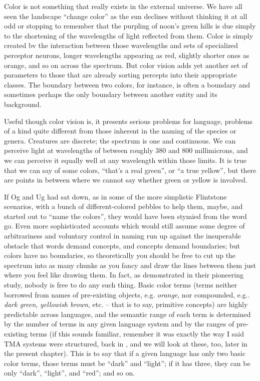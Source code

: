 Color is not something that really exists in the external universe. We have all seen the landscape ``change color'' as the sun declines without thinking it at all odd or stopping to remember that the purpling of noon's green hills is due simply to the shortening of the wavelengths of light reflected from them. Color is simply created bv the interaction between those wavelengths and sets of specialized perceptor neurons, longer wavelengths appearing as red, slightly shorter ones as orange, and so on across the spectrum. But color vision adds yet another set of parameters to those that are already sorting percepts into their
appropriate classes. The boundary between two colors, for instance, is often a boundary and sometimes perhaps the only boundary between another entity and its background.

Useful though color vision is, it presents serious problems for language, problems of a kind quite different from those inherent in the naming of the species or genera. Creatures are discrete; the spectrum is one and continuous. We can perceive light at wavelengths of between roughly 380 and 800 millimicrons, and we can perceive it equally well at any wavelength within those limits. It is true that we can say of some colors, ``that's a real green'', or ``a true yellow'', but there are points in between where we cannot say whether green or yellow is involved.

If Og and Ug had sat down, as in some of the more simplistic Flintstone scenarios, with a bunch of different-colored pebbles to help them, maybe, and started out to ``name the colors'', they would have been stymied from the word go. Even more sophisticated accounts which would still assume some degree of arbitrariness and voluntary control in naming run up against the insuperable obstacle that words demand concepts, and concepts demand boundaries; but colors have no boundaries, so theoretically you should be free to cut up the spectrum into as many chunks as you fancy and draw the lines between them just where you feel like drawing them. In fact, as \citet{Berlin1969} demonstrated in their pioneering study, nobody is free to do any such thing. Basic color terms (terms neither borrowed from names of pre-existing objects, e.g. \textit{orange}, nor compounded, e.g.. \textit{dark green}, \textit{yellowish brown}, etc. -- that is to say, primitive concepts) are highly predictable across languages, and the semantic range of each term is determined by the number of terms in any given language system and by the ranges of pre-existing terms (if this sounds familiar, remember it was exactly the way I said TMA systems were structured, back in , and we will look at these, too, later in the present chapter). This is to say that if a given language has only two basic color terms, those terms must be ``dark'' and ``light''; if it has three, they can be only ``dark'', ``light'', and ``red''; and so on.

